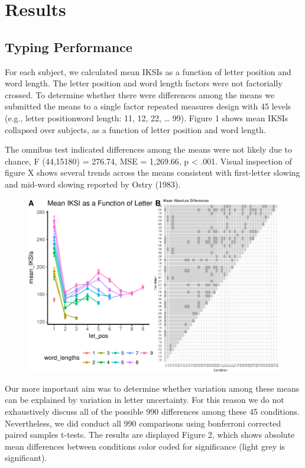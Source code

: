 \documentclass[floatsintext,man]{apa6}
\theoremstyle{definition}
\theoremstyle{definition}
\theoremstyle{definition}
\theoremstyle{remark}
\begin{document}
\section{Results}\label{results}

\subsection{Typing Performance}\label{typing-performance}

For each subject, we calculated mean IKSIs as a function of letter
position and word length. The letter position and word length factors
were not factorially crossed. To determine whether there were
differences among the means we submitted the means to a single factor
repeated measures design with 45 levels (e.g., letter
position\textbar{}word length: 1\textbar{}1, 1\textbar{}2, 2\textbar{}2,
\ldots{} 9\textbar{}9). Figure 1 shows mean IKSIs collapsed over
subjects, as a function of letter position and word length.

The omnibus test indicated differences among the means were not likely
due to chance, F (44,15180) = 276.74, MSE = 1,269.66, p \textless{}
.001. Visual inspection of figure X shows several trends across the
means consistent with first-letter slowing and mid-word slowing reported
by Ostry (1983).

\begin{figure}[htbp]
\centering
\includegraphics{Entropy_typing_draft_files/figure-latex/typing_mean_iksis_comparisons-1.pdf}
\caption{}
\end{figure}

Our more important aim was to determine whether variation among these
means can be explained by variation in letter uncertainty. For this
reason we do not exhaustively discuss all of the possible 990
differences among these 45 conditions. Nevertheless, we did conduct all
990 comparisons using bonferroni corrected paired samples t-tests. The
results are displayed Figure 2, which shows absolute mean differences
between conditions color coded for significance (light grey is
significant).
\end{document}
